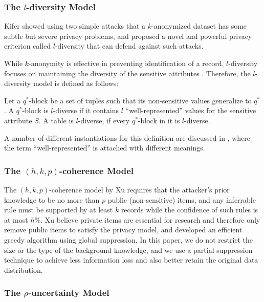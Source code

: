 \subsubsection{The $l$-diversity Model}
Kifer \etal \cite{Kifer:l-diversity} showed using two simple attacks that a
$k$-anonymized dataset has some subtle but severe privacy problems, and
proposed a novel and powerful privacy criterion called $l$-diversity that
can defend against such attacks.

While $k$-anonymity is effective in preventing identification of a record,
$l$-diversity focuses on maintaining the diversity of the sensitive attributes \cite{aggarwal2008general}.
Therefore, the $l$-diversity model is defined as follows:

\begin{definition}
  Let a $q^*$-block be a set of tuples such that its non-sensitive values
  generalize to $q^*$.  A $q^*$-block is $l$-diverse if it contains $l$
  ``well-represented'' values for the sensitive attribute $S$.  A table
  is $l$-diverse, if every $q^*$-block in it is $l$-diverse.
\end{definition}

A number of different instantiations for this definition are discussed
in \cite{Kifer:l-diversity}, where the term
``well-represented'' is attached with different meanings.

\subsubsection{The $(h,k,p)$-coherence Model}
The $(h,k,p)$-coherence model by Xu \etal \cite{Xu:2008:ATD}
requires that the attacker's prior knowledge to be no more than $p$ public
(non-sensitive) items, and any inferrable rule must be supported by at least
$k$ records while the confidence of such rules is at most $h$\%. Xu believe
private items are essential for research and therefore only remove public
items to satisfy the privacy model, and developed an efficient greedy
algorithm using global suppression. In this paper, we do not restrict the
size or the type of the background knowledge, and we use a partial
suppression technique to achieve less information loss and also better retain
the original data distribution.

\subsubsection{The $\rho$-uncertainty Model}

